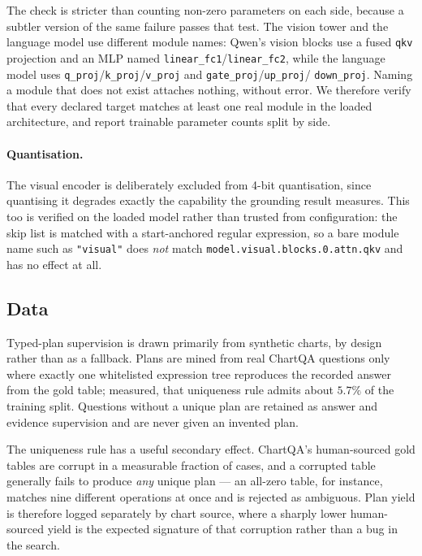 The check is stricter than counting non-zero parameters on each side, because a subtler version of
the same failure passes that test. The vision tower and the language model use different module
names: Qwen's vision blocks use a fused \texttt{qkv} projection and an MLP named
\texttt{linear\_fc1}/\texttt{linear\_fc2}, while the language model uses
\texttt{q\_proj}/\texttt{k\_proj}/\texttt{v\_proj} and \texttt{gate\_proj}/\texttt{up\_proj}/%
\texttt{down\_proj}. Naming a module that does not exist attaches nothing, without error. We
therefore verify that every declared target matches at least one real module in the loaded
architecture, and report trainable parameter counts split by side.

\paragraph{Quantisation.}
The visual encoder is deliberately excluded from 4-bit quantisation, since quantising it degrades
exactly the capability the grounding result measures. This too is verified on the loaded model
rather than trusted from configuration: the skip list is matched with a start-anchored regular
expression, so a bare module name such as \texttt{"visual"} does \emph{not} match
\texttt{model.visual.blocks.0.attn.qkv} and has no effect at all.

\subsection{Data}
\label{sec:method:data}

Typed-plan supervision is drawn primarily from synthetic charts, by design rather than as a
fallback. Plans are mined from real ChartQA questions only where exactly one whitelisted expression
tree reproduces the recorded answer from the gold table; measured, that uniqueness rule admits about
$5.7\%$ of the training split. Questions without a unique plan are retained as answer and evidence
supervision and are never given an invented plan.

The uniqueness rule has a useful secondary effect. ChartQA's human-sourced gold tables are corrupt
in a measurable fraction of cases, and a corrupted table generally fails to produce \emph{any}
unique plan --- an all-zero table, for instance, matches nine different operations at once and is
rejected as ambiguous. Plan yield is therefore logged separately by chart source, where a sharply
lower human-sourced yield is the expected signature of that corruption rather than a bug in the
search.


